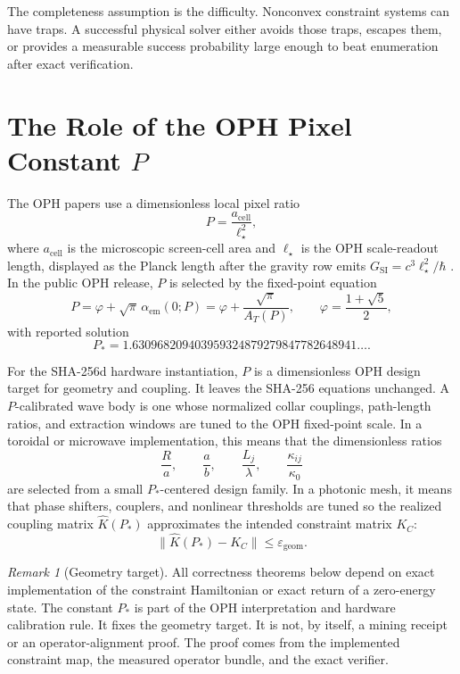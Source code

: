 \documentclass[11pt]{article}
\theoremstyle{definition}
\theoremstyle{remark}
\newtheorem{remark}[theorem]{Remark}
\begin{document}
The completeness assumption is the difficulty. Nonconvex constraint systems can
have traps. A successful physical solver either avoids those traps, escapes
them, or provides a measurable success probability large enough to beat
enumeration after exact verification.

\section{The Role of the OPH Pixel Constant \texorpdfstring{\(P\)}{P}}

The OPH papers use a dimensionless local pixel ratio
\[
P=\frac{a_{\mathrm{cell}}}{\ell_\star^2},
\]
where \(a_{\mathrm{cell}}\) is the microscopic screen-cell area and \(\ell_\star\)
is the OPH scale-readout length, displayed as the Planck length after the gravity row emits
\(G_{\mathrm{SI}}=c^3\ell_\star^2/\hbar\) \cite{OPHCompactCurrent,OPHScreenCurrent}. In the public OPH
release, \(P\) is selected by the fixed-point equation
\[
P=\varphi+\sqrt{\pi}\,\alpha_{\mathrm{em}}(0;P)
=\varphi+\frac{\sqrt{\pi}}{A_T(P)},
\qquad
\varphi=\frac{1+\sqrt5}{2},
\]
with reported solution
\[
P_\ast=1.630968209403959324879279847782648941\ldots.
\]

For the SHA-256d hardware instantiation, \(P\) is a dimensionless OPH design
target for geometry and coupling. It leaves the SHA-256 equations unchanged.
A \(P\)-calibrated
wave body is one whose normalized collar couplings, path-length ratios, and
extraction windows are tuned to the OPH fixed-point scale. In a toroidal or
microwave implementation, this means that the
dimensionless ratios
\[
\frac{R}{a},\qquad
\frac{a}{b},\qquad
\frac{L_j}{\lambda},\qquad
\frac{\kappa_{ij}}{\kappa_0}
\]
are selected from a small \(P_\ast\)-centered design family. In a photonic mesh,
it means that phase shifters, couplers, and nonlinear thresholds are tuned so
the realized coupling matrix \(\widehat K(P_\ast)\) approximates the intended
constraint matrix \(K_C\):
\[
\|\widehat K(P_\ast)-K_C\|\le \varepsilon_{\mathrm{geom}}.
\]

\begin{remark}[Geometry target]
All correctness theorems below depend on exact implementation of the
constraint Hamiltonian or exact return of a zero-energy state. The constant
\(P_\ast\) is part of the OPH interpretation and hardware calibration rule.
It fixes the geometry target. It is not, by itself, a mining receipt or an
operator-alignment proof. The proof comes from the implemented constraint
map, the measured operator bundle, and the exact verifier.
\end{remark}
\end{document}
